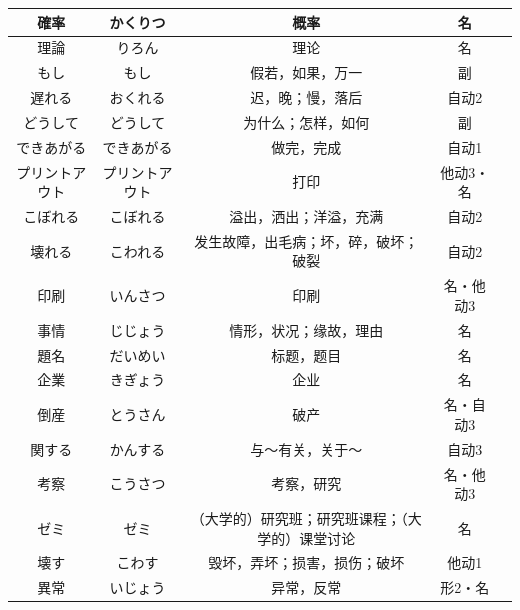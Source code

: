 \begin{longtable}{|c|c|c|c|c|}
    確率 & かくりつ & 概率 & 名 & \\ \hline
    理論 & りろん & 理论 & 名 & \\ \hline
    もし & もし & 假若，如果，万一 & 副 & \\ \hline
    遅れる & おくれる & 迟，晚；慢，落后 & 自动2 & \\ \hline
    どうして & どうして & 为什么；怎样，如何 & 副 & \\ \hline
    できあがる & できあがる & 做完，完成 & 自动1 & \\ \hline
    プリントアウト & プリントアウト & 打印 & 他动3・名 & \\ \hline
    こぼれる & こぼれる & 溢出，洒出；洋溢，充满 & 自动2 & \\ \hline
    壊れる & こわれる & 发生故障，出毛病；坏，碎，破坏；破裂 & 自动2 & \\ \hline
    印刷 & いんさつ & 印刷 & 名・他动3 & \\ \hline
    事情 & じじょう & 情形，状况；缘故，理由 & 名 & \\ \hline
    題名 & だいめい & 标题，题目 & 名 & \\ \hline
    企業 & きぎょう & 企业 & 名 & \\ \hline
    倒産 & とうさん & 破产 & 名・自动3 & \\ \hline
    関する & かんする & 与～有关，关于～ & 自动3 & \\ \hline
    考察 & こうさつ & 考察，研究 & 名・他动3 & \\ \hline
    ゼミ & ゼミ & （大学的）研究班；研究班课程；（大学的）课堂讨论 & 名 & \\ \hline
    壊す & こわす & 毁坏，弄坏；损害，损伤；破坏 & 他动1 & \\ \hline
    異常 & いじょう & 异常，反常 & 形2・名 & \\ \hline
\end{longtable}


